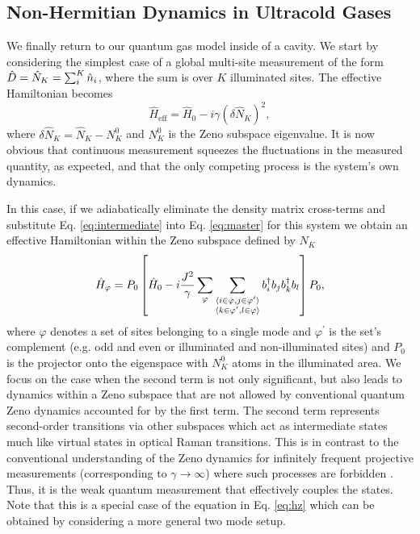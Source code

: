 \subsection{Non-Hermitian Dynamics in Ultracold Gases}

We finally return to our quantum gas model inside of a cavity. We
start by considering the simplest case of a global multi-site
measurement of the form $\hat{D} = \hat{N}_K = \sum_i^K \hat{n}_i$, where
the sum is over $K$ illuminated sites. The effective Hamiltonian
becomes
\begin{equation}
  \label{eq:nHH2}
  \hat{H}_\mathrm{eff} = \hat{H}_0 - i \gamma \left(  \delta \hat{N}_K \right)^2,
\end{equation}
where $ \delta \hat{N}_K = \hat{N}_K - N^0_K$ and $N^0_K$ is the Zeno
subspace eigenvalue. It is now obvious that continuous measurement
squeezes the fluctuations in the measured quantity, as expected, and
that the only competing process is the system's own dynamics.

In this case, if we adiabatically eliminate the density matrix
cross-terms and substitute Eq. \eqref{eq:intermediate} into
Eq. \eqref{eq:master} for this system we obtain an effective
Hamiltonian within the Zeno subspace defined by $N_K$
\begin{equation}
  \hat{H}_\varphi = P_0 \left[ \hat{H}_0 - i \frac{J^2}{\gamma}
    \sum_\varphi \sum_{\substack{\langle i \in \varphi, j \in \varphi^\prime
        \rangle \\ \langle k \in \varphi^\prime, l \in \varphi
        \rangle}} b^\dagger_i b_j b^\dagger_k b_l \right] P_0,
\end{equation}
where $\varphi$ denotes a set of sites belonging to a single mode and
$\varphi^\prime$ is the set's complement (e.g. odd and even or
illuminated and non-illuminated sites) and $P_0$ is the projector onto
the eigenspace with $N_K^0$ atoms in the illuminated area. We focus on
the case when the second term is not only significant, but also leads
to dynamics within a Zeno subspace that are not allowed by
conventional quantum Zeno dynamics accounted for by the first
term. The second term represents second-order transitions via other
subspaces which act as intermediate states much like virtual states in
optical Raman transitions. This is in contrast to the conventional
understanding of the Zeno dynamics for infinitely frequent projective
measurements (corresponding to $\gamma \rightarrow \infty$) where such
processes are forbidden \cite{facchi2008}. Thus, it is the weak
quantum measurement that effectively couples the states. Note that
this is a special case of the equation in Eq. \eqref{eq:hz} which can
be obtained by considering a more general two mode setup.

